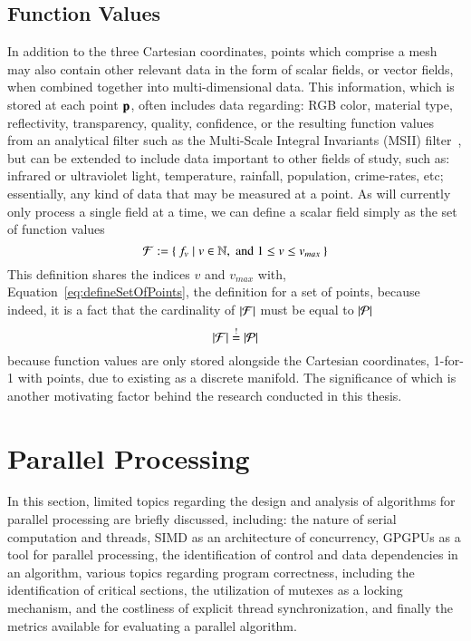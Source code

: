 \subsection{Function Values}
\label{ch2sTDDssFV}
In addition to the three Cartesian coordinates, points which comprise a mesh may also contain other relevant data in the form of scalar fields, or vector fields, when combined together into multi-dimensional data. This information, which is stored at each point $\mathbf{p}$, often includes data regarding: RGB color, material type, reflectivity, transparency, quality, confidence, or the resulting function values from an analytical filter such as the Multi-Scale Integral Invariants (MSII) filter~\cite[p.~21]{Mara12}, but can be extended to include data important to other fields of study, such as: infrared or ultraviolet light, temperature, rainfall, population, crime-rates, etc; essentially, any kind of data that may be measured at a point. As  will currently only process a single field at a time, we can define a scalar field simply as the set of function values
%
\begin{equation}
	\mathcal{F} := \left \{\: f_v \mid v \in \mathbb{N}, \;\text{and}\; 1\leq v \leq v_{max} \:\right \}
	\label{eq:defineSetOfFunctionValues}
\end{equation}%
%
%
%
This definition shares the indices $v$ and $v_{max}$ with, Equation~\ref{eq:defineSetOfPoints}, the definition for a set of points, because indeed, it is a fact that the cardinality of $|\mathcal{F}|$ must be equal to $|\mathcal{P}|$
%
\begin{equation}
	|\mathcal{F}| \overset{!}{=} |\mathcal{P}|
\end{equation}
%
because function values are only stored alongside the Cartesian coordinates, 1-for-1 with points, due to \tdd{} existing as a discrete manifold. The significance of which is another motivating factor behind the research conducted in this thesis.

%
%
%
%
%
%
\section{Parallel Processing}
\label{ch2sPP}
In this section, limited topics regarding the design and analysis of algorithms for parallel processing are briefly discussed, including: the nature of serial computation and threads, SIMD as an architecture of concurrency, GPGPUs as a tool for parallel processing, the identification of control and data dependencies in an algorithm, various topics regarding program correctness, including the identification of critical sections, the utilization of mutexes as a locking mechanism, and the costliness of explicit thread synchronization, and finally the metrics available for evaluating a parallel algorithm.

